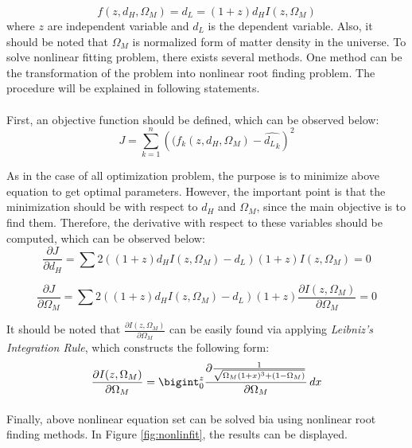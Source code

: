 \documentclass[letterpaper,12pt]{article}
\begin{document}
\begin{equation*}
    f(z, d_H, \Omega_M) = d_L = (1+z)d_H I(z, \Omega_M)
\end{equation*}
where $z$ are independent variable and $d_L$ is the dependent variable. Also, it should be noted that $\Omega_M$ is normalized form of matter density in the universe. To solve nonlinear fitting problem, there exists several methods. One method can be the transformation of the problem into nonlinear root finding problem. The procedure will be explained in following statements.
\paragraph{} First, an objective function should be defined, which can be observed below:
\begin{equation*}
    J = \sum_{k=1}^{n} \left((f_k(z, d_H, \Omega_M) - \hat{{d_L}_k} \right)^2
\end{equation*} 

As in the case of all optimization problem, the purpose is to minimize above equation to get optimal parameters. However, the important point is that the minimization should be with respect to $d_H$ and $\Omega_M$, since the main objective is to find them. Therefore, the derivative with respect to these variables should be computed, which can be observed below:
\begin{equation*}
    \frac{\partial J}{\partial d_H} =\sum 2 \left((1+z)d_H I(z, \Omega_M) -d_L\right)(1+z)I(z, \Omega_M) = 0
\end{equation*}

\begin{equation*}
    \frac{\partial J}{\partial \Omega_M} =\sum 2 \left((1+z)d_H I(z, \Omega_M) -d_L\right)(1+z)\frac{\partial I(z, \Omega_M)}{\partial \Omega_M} = 0
\end{equation*}

It should be noted that $\frac{\partial I(z, \Omega_M)}{\partial \Omega_M}$ can be easily found via applying \textit{Leibniz's Integration Rule}, which constructs the following form:
\begin{equation*}
    \frac{\partial I(z, \Omega_M)}{\partial \Omega_M} = \bigint_{0}^{z}
    \frac{\partial \frac{1}{\sqrt{\Omega_M(1+x)^3 + (1-\Omega_M)}}}{\partial \Omega_M}   \,dx 
\end{equation*}
\paragraph{} Finally, above nonlinear equation set can be solved bia using nonlinear root finding methods. In Figure \ref{fig:nonlinfit}, the results can be displayed.
\end{document}
